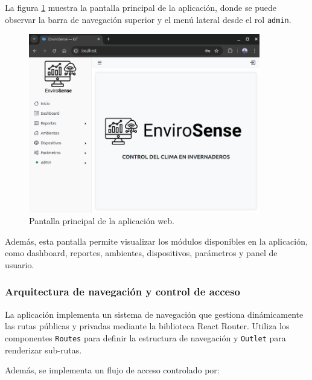La figura \ref{fig:layout} muestra la pantalla principal de la aplicación,
donde se puede observar la barra de navegación superior y el menú lateral desde
el rol \texttt{admin}.

\begin{figure}[H]
    \centering
    \includegraphics[width=0.90\textwidth]{./Images/25_layout.png}
    \caption{Pantalla principal de la aplicación web.}
    \label{fig:layout}
\end{figure}

Además, esta pantalla permite visualizar los módulos disponibles en la
aplicación, como dashboard, reportes, ambientes, dispositivos, parámetros y
panel de usuario.

\subsubsection{Arquitectura de navegación y control de acceso}

La aplicación implementa un sistema de navegación que gestiona dinámicamente
las rutas públicas y privadas mediante la biblioteca React Router. Utiliza los
componentes \texttt{Routes} para definir la estructura de navegación y
\texttt{Outlet} para renderizar sub-rutas.

Además, se implementa un flujo de acceso controlado por:


